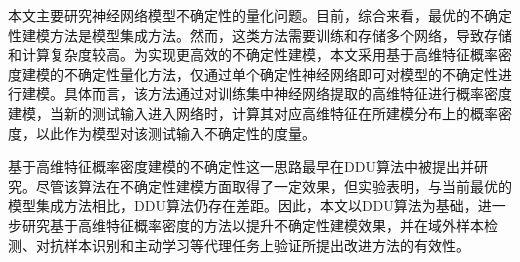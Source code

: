 



本文主要研究神经网络模型不确定性的量化问题。目前，综合来看，最优的不确定性建模方法是模型集成方法。然而，这类方法需要训练和存储多个网络，导致存储和计算复杂度较高。为实现更高效的不确定性建模，本文采用基于高维特征概率密度建模的不确定性量化方法，仅通过单个确定性神经网络即可对模型的不确定性进行建模。具体而言，该方法通过对训练集中神经网络提取的高维特征进行概率密度建模，当新的测试输入进入网络时，计算其对应高维特征在所建模分布上的概率密度，以此作为模型对该测试输入不确定性的度量。

基于高维特征概率密度建模的不确定性这一思路最早在DDU算法\cite{Mukhoti_2023_CVPR}中被提出并研究。尽管该算法在不确定性建模方面取得了一定效果，但实验表明，与当前最优的模型集成方法相比，DDU算法仍存在差距。因此，本文以DDU算法为基础，进一步研究基于高维特征概率密度的方法以提升不确定性建模效果，并在域外样本检测、对抗样本识别和主动学习等代理任务上验证所提出改进方法的有效性。


